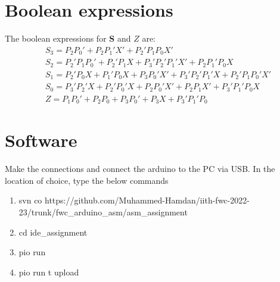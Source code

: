 \documentclass[journal,10pt,twocolumn]{article}
\begin{document}
\section*{\large Boolean expressions}
The boolean expressions for \textbf{S} and $Z$ are:
\begin{align*} %
&S_3 = P_2P_0' + P_2P_1'X' + P_2'P_1P_0X'\\
&S_2 = P_2'P_1P_0' + P_2'P_1X + P_3'P_2'P_1'X' + P_2P_1'P_0X\\
&S_1 = P_2'P_0X + P_1'P_0X + P_3P_0'X' + P_3'P_2'P_1'X + P_2'P_1P_0'X'\\
&S_0 = P_3'P_2'X + P_2'P_0'X + P_2P_0'X' + P_2P_1X' + P_3'P_1'P_0X\\
&Z = P_1P_0' + P_2P_0 + P_3P_0' + P_3X + P_3'P_1'P_0
\end{align*}

\section*{\large Software}
Make the connections and connect the arduino to the PC via USB. In the location of choice, type the below commands
\begin{enumerate}
\item svn co https://github.com/Muhammed-Hamdan/iith-fwc-2022-23/trunk/fwc\_arduino\_asm/asm\_assignment
\item cd ide\_assignment
\item pio run
\item pio run \-t upload
\end{enumerate}
\end{document}
